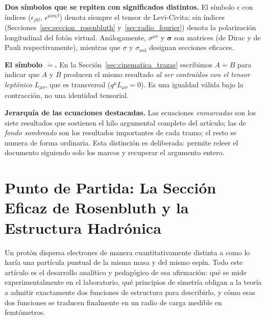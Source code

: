\documentclass[10pt,a4paper]{article}
\begin{document}
\begin{center}
{{\begin{minipage}{0.955\textwidth}
\vspace{0.8ex}
\textbf{Dos símbolos que se repiten con significados distintos.} El símbolo $\epsilon$ con índices ($\epsilon_{jkl}$, $\epsilon^{\mu\nu\alpha\beta}$) denota siempre el tensor de Levi-Civita; sin índices (Secciones~\ref{sec:seccion_rosenbluth} y~\ref{sec:radio_fourier}) denota la polarización longitudinal del fotón virtual. Análogamente, $\sigma^{\mu\nu}$ y $\boldsymbol{\sigma}$ son matrices (de Dirac y de Pauli respectivamente), mientras que $\sigma$ y $\sigma_{\text{red}}$ designan secciones eficaces.

\vspace{0.8ex}
\textbf{El símbolo $\dot{=}$.} En la Sección~\ref{sec:cinematica_trazas} escribimos $A \dot{=} B$ para indicar que $A$ y $B$ producen el mismo resultado \emph{al ser contraídos con el tensor leptónico} $L_{\mu\nu}$, que es transversal ($q^\mu L_{\mu\nu} = 0$). Es una igualdad válida bajo la contracción, no una identidad tensorial.

\vspace{0.8ex}
\textbf{Jerarquía de las ecuaciones destacadas.} Las ecuaciones \emph{enmarcadas} son los siete resultados que sostienen el hilo argumental completo del artículo; las de \emph{fondo sombreado} son los resultados importantes de cada tramo; el resto se numera de forma ordinaria. Esta distinción es deliberada: permite releer el documento siguiendo solo los marcos y recuperar el argumento entero.
\end{minipage}}}
\end{center}

\vspace{1.0em}
\section{Punto de Partida: La Sección Eficaz de Rosenbluth y la Estructura Hadrónica}
\label{sec:punto_de_partida}

Un protón dispersa electrones de manera cuantitativamente distinta a como lo haría una partícula puntual de la misma masa y del mismo espín. Todo este artículo es el desarrollo analítico y pedagógico de esa afirmación: qué se mide experimentalmente en el laboratorio, qué principios de simetría obligan a la teoría a admitir exactamente dos funciones de estructura para describirlo, y cómo esas dos funciones se traducen finalmente en un radio de carga medible en femtómetros.
\end{document}

